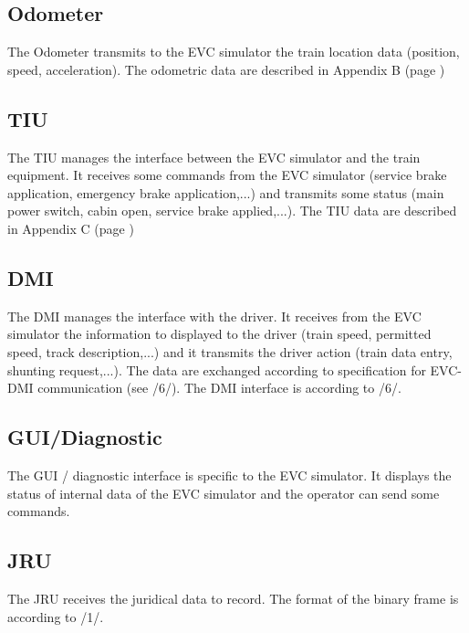 \documentclass[nocc]{template/openetcs_report}
\begin{document}
\subsection{Odometer}
The Odometer transmits to the EVC simulator the train location data (position, speed, acceleration). The odometric data are described in Appendix B (page \pageref{odometric_data})
\subsection{TIU}
The TIU manages the interface between the EVC simulator and the train equipment. It receives some commands from the EVC simulator (service brake application, emergency brake application,...) and transmits some status (main power switch, cabin open, service brake applied,...). The TIU data are described in  Appendix C (page \pageref{tiu_data})
\subsection{DMI}
The DMI manages the interface with the driver. It receives from the EVC simulator the information to displayed to the driver (train speed, permitted speed, track description,...) and it transmits the driver action (train data entry, shunting request,...).
The data are exchanged according to specification for EVC-DMI communication (see /6/).
The DMI interface is according to /6/.
\subsection{GUI/Diagnostic}
The GUI / diagnostic interface is specific to the EVC simulator. It displays the status of internal data of the EVC simulator and the operator can send some commands.
\subsection{JRU}
The JRU receives the juridical data to record. The format of the binary frame is according to /1/.
\end{document}
